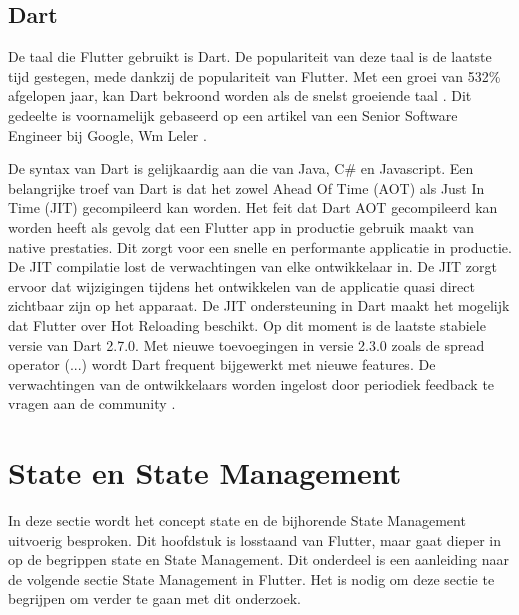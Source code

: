 \subsection{Dart}
\label{ch:dart}
De taal die Flutter gebruikt is Dart. De populariteit van deze taal is de laatste tijd gestegen, mede dankzij de populariteit van Flutter. Met een groei van 532\% afgelopen jaar, kan Dart bekroond worden als de snelst groeiende taal \autocite{Chan2019}. 
Dit gedeelte is voornamelijk gebaseerd op een artikel van een Senior Software Engineer bij Google, Wm Leler \autocite{Leler2017a}.

De syntax van Dart is gelijkaardig aan die van Java, C\# en Javascript.
Een belangrijke troef van Dart is dat het zowel Ahead Of Time (AOT) als Just In Time (JIT) gecompileerd kan worden. Het feit dat Dart AOT gecompileerd kan worden heeft als gevolg dat een Flutter app in productie gebruik maakt van native prestaties. Dit zorgt voor een snelle en performante applicatie in productie.
De JIT compilatie lost de verwachtingen van elke ontwikkelaar in. De JIT zorgt ervoor dat wijzigingen tijdens het ontwikkelen van de applicatie quasi direct zichtbaar zijn op het apparaat. De JIT ondersteuning in Dart maakt het mogelijk dat Flutter over Hot Reloading beschikt. \autocite{Leler2017a}
\newline
Op dit moment is de laatste stabiele versie van Dart 2.7.0. Met nieuwe toevoegingen in versie 2.3.0 zoals de spread operator (...) wordt Dart frequent bijgewerkt met nieuwe features. De verwachtingen van de ontwikkelaars worden ingelost door periodiek feedback te vragen aan de community \autocite{Thomsen2019}.

\section{State en State Management}
In deze sectie wordt het concept state en de bijhorende State Management uitvoerig besproken. Dit hoofdstuk is losstaand van Flutter, maar gaat dieper in op de begrippen state en State Management. Dit onderdeel is een aanleiding naar de volgende sectie State Management in Flutter. Het is nodig om deze sectie te begrijpen om verder te gaan met dit onderzoek.

